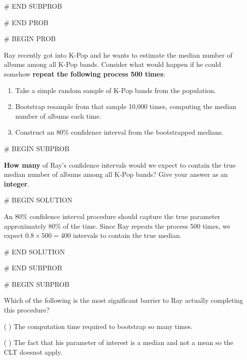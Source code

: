 \documentclass[twoside,12pt]{article}
\begin{document}
{# END SUBPROB




# END PROB

\newpage

# BEGIN PROB



Ray recently got into K-Pop and he wants to estimate the median number of albums among all K-Pop bands. Consider what would happen if he could somehow \textbf{repeat the following process 500 times}:

\begin{enumerate}
    \item Take a simple random sample of K-Pop bands from the population.
    \item Bootstrap resample from that sample 10{,}000 times, computing the median number of albums each time.
    \item Construct an 80\% confidence interval from the bootstrapped medians.
\end{enumerate}



# BEGIN SUBPROB

 \textbf{How many} of Ray's confidence intervals would we expect to contain the true median number of albums among all K-Pop bands? Give your answer as an \textbf{integer}.

\smallskip

\begin{center}
\end{center}

# BEGIN SOLUTION


An 80\% confidence interval procedure should capture the true parameter approximately 80\% of the time. Since Ray repeats the process 500 times, we expect $0.8 \times 500 = 400$ intervals to contain the true median.


# END SOLUTION



# END SUBPROB

\bigskip

# BEGIN SUBPROB


Which of the following is the most significant barrier to Ray actually completing this procedure?

\smallskip
( ) The computation time required to bootstrap so many times.

\smallskip
( ) The fact that his parameter of interest is a median and not a mean so the CLT does\gap not apply.

}
\end{document}
